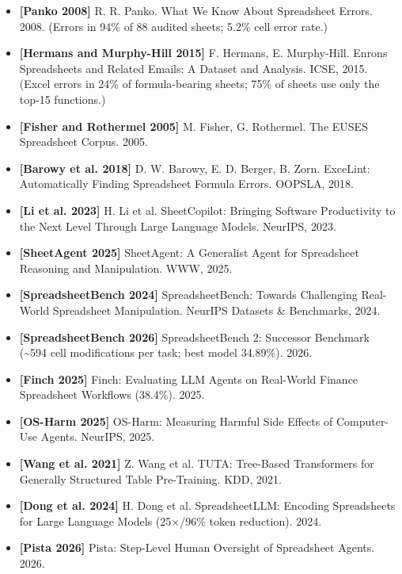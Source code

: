 \documentclass[
]{article}
\providecommand{\tightlist}{%
  \setlength{\itemsep}{0pt}\setlength{\parskip}{0pt}}
\begin{document}
\begin{itemize}
\tightlist
\item
  \textbf{{[}Panko 2008{]}} R. R. Panko. What We Know About Spreadsheet
  Errors. 2008. (Errors in 94\% of 88 audited sheets; 5.2\% cell error
  rate.)
\item
  \textbf{{[}Hermans and Murphy-Hill 2015{]}} F. Hermans, E.
  Murphy-Hill. Enron\textquotesingle s Spreadsheets and Related Emails:
  A Dataset and Analysis. ICSE, 2015. (Excel errors in 24\% of
  formula-bearing sheets; 75\% of sheets use only the top-15 functions.)
\item
  \textbf{{[}Fisher and Rothermel 2005{]}} M. Fisher, G. Rothermel. The
  EUSES Spreadsheet Corpus. 2005.
\item
  \textbf{{[}Barowy et al. 2018{]}} D. W. Barowy, E. D. Berger, B. Zorn.
  ExceLint: Automatically Finding Spreadsheet Formula Errors. OOPSLA,
  2018.
\item
  \textbf{{[}Li et al. 2023{]}} H. Li et al. SheetCopilot: Bringing
  Software Productivity to the Next Level Through Large Language Models.
  NeurIPS, 2023.
\item
  \textbf{{[}SheetAgent 2025{]}} SheetAgent: A Generalist Agent for
  Spreadsheet Reasoning and Manipulation. WWW, 2025.
\item
  \textbf{{[}SpreadsheetBench 2024{]}} SpreadsheetBench: Towards
  Challenging Real-World Spreadsheet Manipulation. NeurIPS Datasets \&
  Benchmarks, 2024.
\item
  \textbf{{[}SpreadsheetBench 2026{]}} SpreadsheetBench 2: Successor
  Benchmark (\textasciitilde594 cell modifications per task; best model
  34.89\%). 2026.
\item
  \textbf{{[}Finch 2025{]}} Finch: Evaluating LLM Agents on Real-World
  Finance Spreadsheet Workflows (38.4\%). 2025.
\item
  \textbf{{[}OS-Harm 2025{]}} OS-Harm: Measuring Harmful Side Effects of
  Computer-Use Agents. NeurIPS, 2025.
\item
  \textbf{{[}Wang et al. 2021{]}} Z. Wang et al. TUTA: Tree-Based
  Transformers for Generally Structured Table Pre-Training. KDD, 2021.
\item
  \textbf{{[}Dong et al. 2024{]}} H. Dong et al. SpreadsheetLLM:
  Encoding Spreadsheets for Large Language Models (25×/96\% token
  reduction). 2024.
\item
  \textbf{{[}Pista 2026{]}} Pista: Step-Level Human Oversight of
  Spreadsheet Agents. 2026.
\end{itemize}
\end{document}

